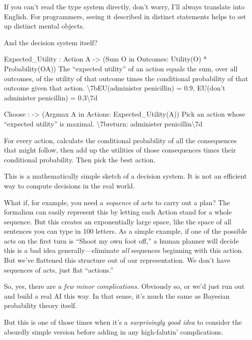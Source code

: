{
 If you can't read the type system directly,
don't worry, I'll always translate into
English. For programmers, seeing it described in distinct statements
helps to set up distinct mental objects.}

{
 And the decision system itself?}

{
  Expected\_Utility : Action A -{\textgreater}\newline
 (Sum O in Outcomes: Utility(O) * Probability(O{\textbar}A)) The
``expected utility'' of an action
equals the sum, over all outcomes, of the utility of that outcome times
the conditional probability of that outcome given that action.
{\textbackslash}{\textquotesingle}7bEU(administer penicillin) = 0.9,
EU(don't administer penicillin) =
0.3{\textbackslash}{\textquotesingle}7d }

{
  Choose :\newline
 -{\textgreater} (Argmax A in Actions: Expected\_Utility(A)) Pick an
action whose ``expected utility'' is
maximal. {\textbackslash}{\textquotesingle}7breturn: administer
penicillin{\textbackslash}{\textquotesingle}7d }

{
 For every action, calculate the conditional probability of all the
consequences that might follow, then add up the utilities of those
consequences times their conditional probability. Then pick the best
action.}

{
 This is a mathematically simple sketch of a decision system. It is
not an efficient way to compute decisions in the real world.}

{
 What if, for example, you need a \textit{sequence} of acts to
carry out a plan? The formalism can easily represent this by letting
each Action stand for a whole sequence. But this creates an
exponentially large space, like the space of all sentences you can type
in 100 letters. As a simple example, if one of the possible acts on the
first turn is ``Shoot my own foot
off,'' a human planner will decide this is a bad idea
generally---eliminate \textit{all} sequences beginning with this
action. But we've flattened this structure out of our
representation. We don't have sequences of acts, just
flat ``actions.''}

{
 So, yes, there are \textit{a few minor complications.} Obviously
so, or we'd just run out and build a real AI this way.
In that sense, it's much the same as Bayesian
probability theory itself.}

{
 But this is one of those times when it's a
\textit{surprisingly good idea} to consider the absurdly simple version
before adding in any high-falutin' complications.}

